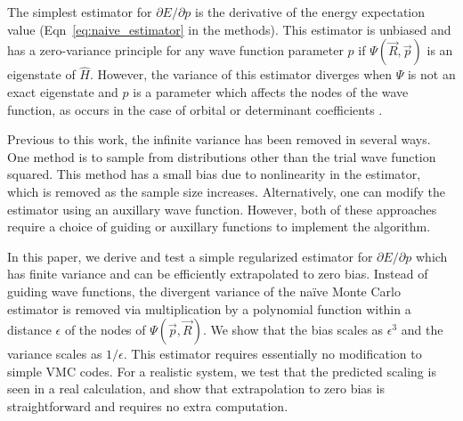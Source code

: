 \documentclass[twocolumn]{revtex4-1}
\begin{document}
The simplest estimator for $\partial E/\partial p$ is the derivative of the energy expectation value (Eqn~\ref{eq:naive_estimator} in the methods).
This estimator is unbiased and has a zero-variance principle for any wave function parameter $p$ if $\Psi(\vec{R}, \vec{p})$ is an eigenstate of $\hat{H}$.
However, the variance of this estimator diverges when $\Psi$ is not an exact eigenstate and $p$ is a parameter which affects the nodes of the wave function, as occurs in the case of orbital or determinant coefficients \cite{Avella, doi:10.1063/1.4933112}.

Previous to this work, the infinite variance has been removed in several ways. 
One method is to sample from distributions other than the trial wave function squared.\cite{Avella, Attaccalite2008, Zen2013} 
This method has a small bias\cite{doi:10.1063/1.4933112} due to nonlinearity in the estimator, which is removed as the sample size increases.
Alternatively, one can modify the estimator using an auxillary wave function.\cite{Assaraf1999, doi:10.1063/1.1286598, Assaraf2003}
However, both of these approaches require a choice of guiding or auxillary functions to implement the algorithm.

In this paper, we derive and test a simple regularized estimator for $\partial E/\partial p$ which has finite variance and can be efficiently extrapolated to zero bias.
Instead of guiding wave functions, the divergent variance of the na\"ive Monte Carlo estimator is removed via multiplication by a polynomial function within a distance $\epsilon$ of the nodes of $\Psi(\vec{p}, \vec{R})$. 
We show that the bias scales as $\epsilon^3$ and the variance scales as $1/\epsilon$. 
This estimator requires essentially no modification to simple VMC codes. 
For a realistic system, we test that the predicted scaling is seen in a real calculation, and show that extrapolation to zero bias is straightforward and requires no extra computation.
\end{document}
